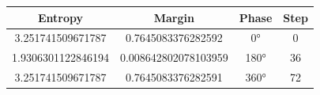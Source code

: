\begin{table}[h]
\centering
\begin{tabular}{ |c|c|c|c| }
\hline
Entropy & Margin & Phase & Step \\
\hline
3.251741509671787 & 0.7645083376282592 & 0° & 0 \\
\hline
1.9306301122846194 & 0.008642802078103959 & 180° & 36 \\
\hline
3.251741509671787 & 0.7645083376282591 & 360° & 72 \\
\hline
\end{tabular}
\end{table}
